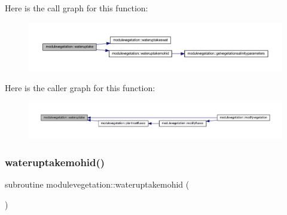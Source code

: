 Here is the call graph for this function\+:\nopagebreak
\begin{figure}[H]
\begin{center}
\leavevmode
\includegraphics[width=350pt]{namespacemodulevegetation_a8970a84682188f12c5a7e3c69fdbc853_cgraph}
\end{center}
\end{figure}
Here is the caller graph for this function\+:\nopagebreak
\begin{figure}[H]
\begin{center}
\leavevmode
\includegraphics[width=350pt]{namespacemodulevegetation_a8970a84682188f12c5a7e3c69fdbc853_icgraph}
\end{center}
\end{figure}
\mbox{\label{namespacemodulevegetation_ac76c877ab32f2ff96b234d3ba23b4dbc}} 
\subsubsection{\texorpdfstring{wateruptakemohid()}{wateruptakemohid()}}
{\footnotesize\ttfamily subroutine modulevegetation\+::wateruptakemohid (\begin{DoxyParamCaption}{ }\end{DoxyParamCaption})\hspace{0.3cm}{\ttfamily [private]}}

